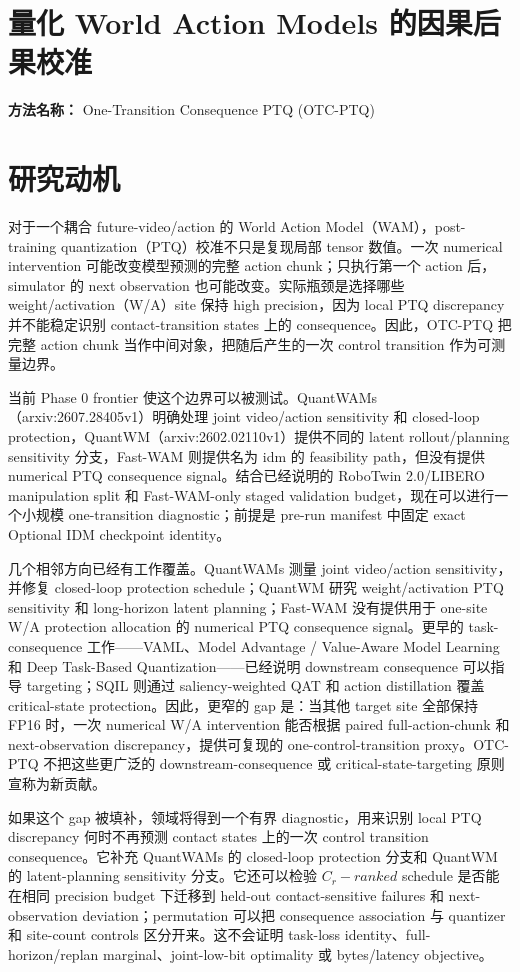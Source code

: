\documentclass[10pt,a4paper]{article}
\begin{document}
\section*{量化 World Action Models 的因果后果校准}
\textbf{方法名称：} One-Transition Consequence PTQ (OTC-PTQ)
\section*{研究动机}
对于一个耦合 future-video/action 的 World Action Model（WAM），post-training quantization（PTQ）校准不只是复现局部 tensor 数值。一次 numerical intervention 可能改变模型预测的完整 action chunk；只执行第一个 action 后，simulator 的 next observation 也可能改变。实际瓶颈是选择哪些 weight/activation（W/A）site 保持 high precision，因为 local PTQ discrepancy 并不能稳定识别 contact-transition states 上的 consequence。因此，OTC-PTQ 把完整 action chunk 当作中间对象，把随后产生的一次 control transition 作为可测量边界。

当前 Phase 0 frontier 使这个边界可以被测试。QuantWAMs（arxiv:2607.28405v1）明确处理 joint video/action sensitivity 和 closed-loop protection，QuantWM（arxiv:2602.02110v1）提供不同的 latent rollout/planning sensitivity 分支，Fast-WAM 则提供名为 idm 的 feasibility path，但没有提供 numerical PTQ consequence signal。结合已经说明的 RoboTwin 2.0/LIBERO manipulation split 和 Fast-WAM-only staged validation budget，现在可以进行一个小规模 one-transition diagnostic；前提是 pre-run manifest 中固定 exact Optional IDM checkpoint identity。

几个相邻方向已经有工作覆盖。QuantWAMs 测量 joint video/action sensitivity，并修复 closed-loop protection schedule；QuantWM 研究 weight/activation PTQ sensitivity 和 long-horizon latent planning；Fast-WAM 没有提供用于 one-site W/A protection allocation 的 numerical PTQ consequence signal。更早的 task-consequence 工作------VAML、Model Advantage / Value-Aware Model Learning 和 Deep Task-Based Quantization------已经说明 downstream consequence 可以指导 targeting；SQIL 则通过 saliency-weighted QAT 和 action distillation 覆盖 critical-state protection。因此，更窄的 gap 是：当其他 target site 全部保持 FP16 时，一次 numerical W/A intervention 能否根据 paired full-action-chunk 和 next-observation discrepancy，提供可复现的 one-control-transition proxy。OTC-PTQ 不把这些更广泛的 downstream-consequence 或 critical-state-targeting 原则宣称为新贡献。

如果这个 gap 被填补，领域将得到一个有界 diagnostic，用来识别 local PTQ discrepancy 何时不再预测 contact states 上的一次 control transition consequence。它补充 QuantWAMs 的 closed-loop protection 分支和 QuantWM 的 latent-planning sensitivity 分支。它还可以检验 \(C_{r}-ranked\) schedule 是否能在相同 precision budget 下迁移到 held-out contact-sensitive failures 和 next-observation deviation；permutation 可以把 consequence association 与 quantizer 和 site-count controls 区分开来。这不会证明 task-loss identity、full-horizon/replan marginal、joint-low-bit optimality 或 bytes/latency objective。
\end{document}
